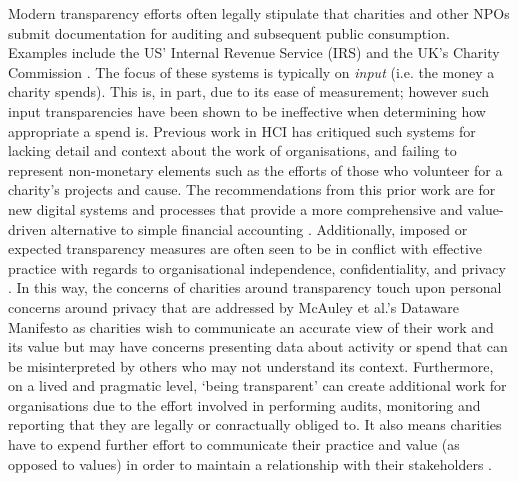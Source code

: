 Modern transparency efforts often legally stipulate that charities and other NPOs submit documentation for auditing and subsequent public consumption. Examples include the US' Internal Revenue Service (IRS) \cite{internal_revenue_service_annual_2016} and the UK's Charity Commission \cite{hm_government_charity_????}. The focus of these systems is typically on \textit{input} (i.e. the money a charity spends). This is, in part, due to its ease of measurement; however such input transparencies \cite{heald_varieties_2006} have been shown to be ineffective when determining how appropriate a spend is. Previous work in HCI has critiqued such systems for lacking detail and context about the work of organisations, and failing to represent non-monetary elements such as the efforts of those who volunteer for a charity's projects and cause. The recommendations from this prior work are for new digital systems and processes that provide a more comprehensive and value-driven alternative to simple financial accounting \cite{marshall_accountable:_2016}. Additionally, imposed or expected transparency measures are often seen to be in conflict with effective practice with regards to organisational independence, confidentiality, and privacy \cite{cukierman_limits_2009, schauer_mixed_2014}. In this way, the concerns of charities around transparency touch upon personal concerns around privacy that are addressed by McAuley et al.'s  Dataware Manifesto \cite{mcauley_dataware_2011} as charities wish to communicate an accurate view of their work and its value but may have concerns presenting data about activity or spend that can be misinterpreted by others who may not understand its context. Furthermore, on a lived and pragmatic level, `being transparent' can create additional work for organisations due to the effort involved in performing audits, monitoring and reporting that they are legally or conractually obliged to. It also means charities have to expend further effort to communicate their practice and value (as opposed to values) in order to maintain a relationship with their stakeholders \cite{macmillan_relationship_2005}.

